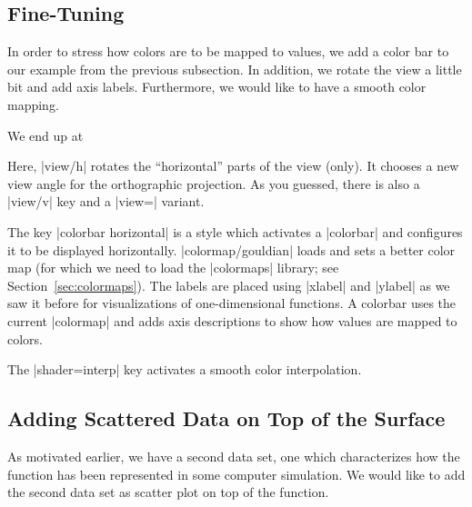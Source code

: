 \subsection{Fine-Tuning}

In order to stress how colors are to be mapped to values, we add a color bar to
our example from the previous subsection. In addition, we rotate the view a
little bit and add axis labels. Furthermore, we would like to have a smooth
color mapping.

We end up at
%
\pgfplotsexpensiveexample
\begin{codeexample}[]
\end{codeexample}
%
Here, |view/h| rotates the ``horizontal'' parts of the view (only). It chooses
a new view angle for the orthographic projection. As you guessed, there is also
a |view/v| key and a |view=| variant.

The key |colorbar horizontal| is a style which activates a |colorbar| and
configures it to be displayed horizontally. |colormap/gouldian| loads and sets
a better color map (for which we need to load the |colormaps| library; see
Section~\ref{sec:colormaps}). The labels are placed using |xlabel| and |ylabel|
as we saw it before for visualizations of one-dimensional functions. A colorbar
uses the current |colormap| and adds axis descriptions to show how values are
mapped to colors.

 The |shader=interp| key activates a smooth color interpolation.


\subsection{Adding Scattered Data on Top of the Surface}

As motivated earlier, we have a second data set, one which characterizes how
the function has been represented in some computer simulation. We would like to
add the second data set as scatter plot on top of the function.

